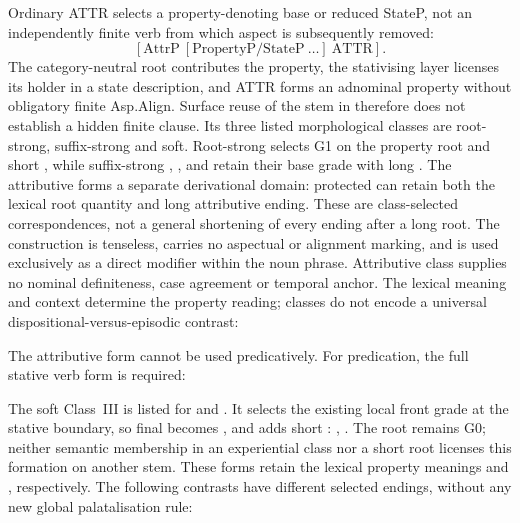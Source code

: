 Ordinary ATTR selects a property-denoting base or reduced StateP, not an
independently finite verb from which aspect is subsequently removed:
\[
[\mathrm{AttrP}\ [\mathrm{PropertyP}/\mathrm{StateP}\ \ldots]\ \mathrm{ATTR}].
\]
The category-neutral root contributes the property, the stativising layer
licenses its holder in a state description, and ATTR forms an adnominal
property without obligatory finite Asp.Align. Surface reuse of the stem in
 therefore does not establish a hidden finite clause. Its three
listed morphological classes are root-strong, suffix-strong and soft. Root-strong  selects G1 on the
property root and short , while suffix-strong ,
, and  retain their base grade with long
. The attributive forms a separate derivational domain: protected
 can retain both the lexical root quantity and long
attributive ending. These are class-selected correspondences, not a general
shortening of every ending after a long root. The construction is tenseless,
carries no aspectual or alignment marking, and is used exclusively as a
direct modifier within the noun phrase. Attributive class supplies no
nominal definiteness, case agreement or temporal anchor. The lexical meaning
and context determine the property reading; classes do not encode a universal
dispositional-versus-episodic contrast:

\pex
\a {} 
\a {} 
\a {} 
\xe

The attributive form cannot be used predicatively. For predication, the full
stative verb form is required:

\pex
\a {}  
\a {} 
\xe

The soft Class~III is listed for  and .
It selects the existing local front grade at the stative boundary, so final
 becomes , and adds short : ,
. The root remains G0; neither semantic membership in an
experiential class nor a short root licenses this formation on another stem.
These forms retain the lexical property meanings  and
, respectively. The following contrasts have different selected
endings, without any new global palatalisation rule:

\pex
\a {}
\a {}
\a {}
\a {}
\xe

